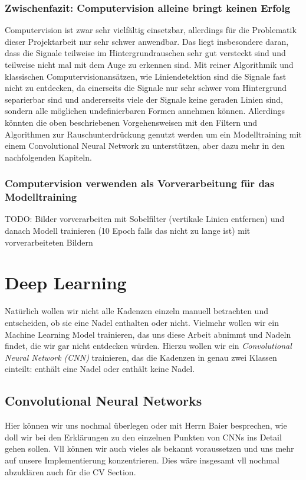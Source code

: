 \documentclass[11pt, a4paper]{article}
\begin{document}
\subsubsection{Zwischenfazit: Computervision alleine bringt keinen Erfolg}
Computervision ist zwar sehr vielfältig einsetzbar, allerdings für die Problematik dieser Projektarbeit nur sehr schwer anwendbar. Das liegt insbesondere daran, dass die Signale teilweise im Hintergrundrauschen sehr gut versteckt sind und teilweise nicht mal mit dem Auge zu erkennen sind. Mit reiner Algorithmik und klassischen Computervisionansätzen, wie Liniendetektion sind die Signale fast nicht zu entdecken, da einerseits die Signale nur sehr schwer vom Hintergrund separierbar sind und andererseits viele der Signale keine geraden Linien sind, sondern alle möglichen undefinierbaren Formen annehmen können. Allerdings könnten die oben beschriebenen Vorgehensweisen mit den Filtern und Algorithmen zur Rauschunterdrückung genutzt werden um ein Modelltraining mit einem Convolutional Neural Network zu unterstützen, aber dazu mehr in den nachfolgenden Kapiteln.

\subsubsection{Computervision verwenden als Vorverarbeitung für das Modelltraining}
TODO: Bilder vorverarbeiten mit Sobelfilter (vertikale Linien entfernen) und danach Modell trainieren (10 Epoch falls das nicht zu lange ist) mit vorverarbeiteten Bildern

\section{Deep Learning}
Natürlich wollen wir nicht alle Kadenzen einzeln manuell betrachten und entscheiden, ob sie eine Nadel enthalten oder nicht. Vielmehr wollen wir ein Machine Learning Model trainieren, das uns diese Arbeit abnimmt und Nadeln findet, die wir gar nicht entdecken würden. Hierzu wollen wir ein \emph{Convolutional Neural Network (CNN)} trainieren, das die Kadenzen in genau zwei Klassen einteilt: enthält eine Nadel oder enthält keine Nadel.

\subsection{Convolutional Neural Networks}
Hier können wir uns nochmal überlegen oder mit Herrn Baier besprechen, wie doll wir bei den Erklärungen zu den einzelnen Punkten von CNNs ins Detail gehen sollen. Vll können wir auch vieles als bekannt voraussetzen und uns mehr auf unsere Implementierung konzentrieren. Dies wäre insgesamt vll nochmal abzuklären auch für die CV Section.
\end{document}
